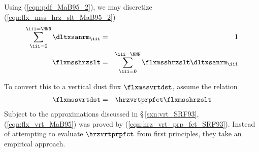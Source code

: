 \documentclass[12pt,twoside]{book}
\begin{document}
Using (\ref{eqn:pdf_MaB95_2}), we may discretize
(\ref{eqn:flx_mss_hrz_slt_MaB95_2}) 
\begin{eqnarray}
\sum_{\iii = 0}^{\iii = \NNN} \dltxsanrm_{\iii} & = & 1 \nonumber \\
\flxmsshrzslt & = & \sum_{\iii = 0}^{\iii = \NNN} \flxmsshrzslt \dltxsanrm_{\iii}
\label{eqn:flx_mss_hrz_slt_dsc_MaB95}
\end{eqnarray}

To convert this to a vertical dust flux $\flxmssvrtdst$, \cite{MaB95}
assume the relation 
\begin{eqnarray}
\flxmssvrtdst & = & \hrzvrtprpfct \flxmsshrzslt
\label{eqn:flx_vrt_MaB95}
\end{eqnarray}
Subject to the approximations discussed in \S\,\ref{sxn:vrt_SRF93},
(\ref{eqn:flx_vrt_MaB95}) was proved by \cite{SRF93}
(\ref{eqn:hrz_vrt_prp_fct_SRF93}).  
Instead of attempting to evaluate $\hrzvrtprpfct$ from first
principles, they take an empirical approach.
\end{document}

